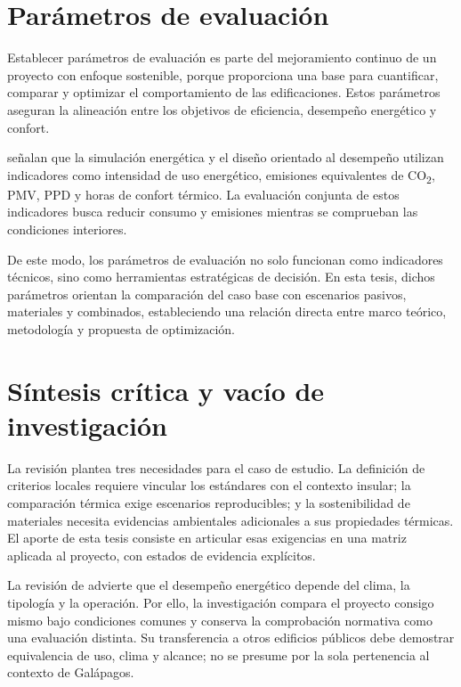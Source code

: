 \section{Parámetros de evaluación}

\begin{textoDosTercios}

Establecer parámetros de evaluación es parte del mejoramiento continuo de un proyecto con enfoque sostenible, porque proporciona una base para cuantificar, comparar y optimizar el comportamiento de las edificaciones. Estos parámetros aseguran la alineación entre los objetivos de eficiencia, desempeño energético y confort.

\textcite{panBuildingEnergySimulation2023} señalan que la simulación energética y el diseño orientado al desempeño utilizan indicadores como intensidad de uso energético, emisiones equivalentes de CO\textsubscript{2}, PMV, PPD y horas de confort térmico. La evaluación conjunta de estos indicadores busca reducir consumo y emisiones mientras se comprueban las condiciones interiores.

De este modo, los parámetros de evaluación no solo funcionan como indicadores técnicos, sino como herramientas estratégicas de decisión. En esta tesis, dichos parámetros orientan la comparación del caso base con escenarios pasivos, materiales y combinados, estableciendo una relación directa entre marco teórico, metodología y propuesta de optimización.

\end{textoDosTercios}

\section{Síntesis crítica y vacío de investigación}
La revisión plantea tres necesidades para el caso de estudio. La definición de criterios locales requiere vincular los estándares con el contexto insular; la comparación térmica exige escenarios reproducibles; y la sostenibilidad de materiales necesita evidencias ambientales adicionales a sus propiedades térmicas. El aporte de esta tesis consiste en articular esas exigencias en una matriz aplicada al proyecto, con estados de evidencia explícitos.

La revisión de \textcite{ribeiroLEEDCertificationBuilding} advierte que el desempeño energético depende del clima, la tipología y la operación. Por ello, la investigación compara el proyecto consigo mismo bajo condiciones comunes y conserva la comprobación normativa como una evaluación distinta. Su transferencia a otros edificios públicos debe demostrar equivalencia de uso, clima y alcance; no se presume por la sola pertenencia al contexto de Galápagos.

